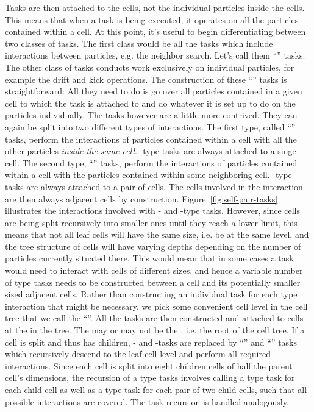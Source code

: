 Tasks are then attached to the cells, not the individual particles inside the cells. This means that
when a task is being executed, it operates on all the particles contained within a cell. At this
point, it's useful to begin differentiating between two classes of tasks. The first class would be
all the tasks which include interactions between particles, e.g. the neighbor search. Let's call
them ``'' tasks. The other class of tasks conducts work exclusively on individual
particles, for example the drift and kick operations. The construction of these ``''
tasks is straightforward: All they need to do is go over all particles contained in a given cell to
which the task is attached to and do whatever it is set up to do on the particles individually. The
 tasks however are a little more contrived. They can again be split into two
different types of interactions. The first type, called ``'' tasks, perform the
interactions of particles contained within a cell with all the other particles \emph{inside the same
cell}. -type tasks are always attached to a singe cell. The second type,
``'' tasks, perform the interactions of particles contained within a cell with the
particles contained within some neighboring cell. -type tasks are always attached to a
pair of cells. The cells involved in the interaction are then always adjacent cells by construction.
Figure~\ref{fig:self-pair-tasks} illustrates the interactions involved with - and
-type tasks. However, since cells are being split recursively into smaller ones until
they reach a lower limit, this means that not all leaf cells will have the same size, i.e. be at the
same level, and the tree structure of cells will have varying depths depending on the number of
particles currently situated there. This would mean that in some cases a task would need to interact
with cells of different sizes, and hence a variable number of  type tasks needs to be
constructed between a cell and its potentially smaller sized adjacent cells. Rather than
constructing an individual task for each  type interaction that might be necessary, we
pick some convenient cell level in the cell tree that we call the ``''.
All the tasks are then constructed and attached to cells at the  in the tree.
The  may or may not be the , i.e. the root of the cell tree. If
a  cell is split and thus has children, - and -tasks are
replaced by ``'' and ``'' tasks which recursively descend to the
leaf cell level and perform all required interactions. Since each cell is split into eight children
cells of half the parent cell's dimensions, the recursion of a  type tasks involves
calling a  type task for each child cell as well as a  type task
for each pair of two child cells, such that all possible interactions are covered. The
 task recursion is handled analogously.


